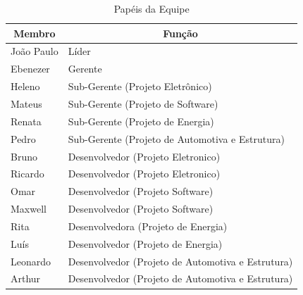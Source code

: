 \begin{table}[h!]
\centering
\caption{Papéis da Equipe}
\label{papeisDaEquipe}
\begin{tabular}{|l|l|}
\hline
\multicolumn{1}{|c|}{\textbf{Membro}} & \multicolumn{1}{c|}{\textbf{Função}}              \\ \hline
João Paulo                            & Líder                                             \\ \hline
Ebenezer                              & Gerente                                           \\ \hline
Heleno                                & Sub-Gerente (Projeto Eletrônico)                  \\ \hline
Mateus                                & Sub-Gerente (Projeto de Software)                 \\ \hline
Renata                                & Sub-Gerente (Projeto de Energia)                  \\ \hline
Pedro                                 & Sub-Gerente (Projeto de Automotiva e Estrutura)   \\ \hline
Bruno                                 & Desenvolvedor (Projeto Eletronico)                \\ \hline
Ricardo                               & Desenvolvedor (Projeto Eletronico)                \\ \hline
Omar                                  & Desenvolvedor (Projeto Software)                  \\ \hline
Maxwell                               & Desenvolvedor (Projeto Software)                  \\ \hline
Rita                                  & Desenvolvedora (Projeto de Energia)               \\ \hline
Luís                                  & Desenvolvedor (Projeto de Energia)                \\ \hline
Leonardo                              & Desenvolvedor (Projeto de Automotiva e Estrutura) \\ \hline
Arthur                                & Desenvolvedor (Projeto de Automotiva e Estrutura) \\ \hline
\end{tabular}
\end{table}

